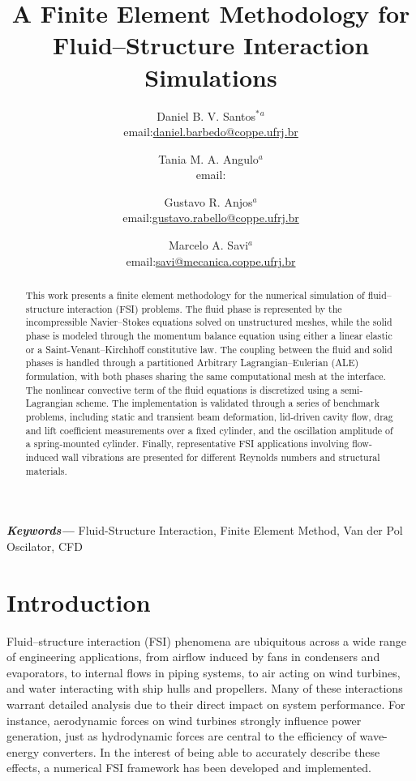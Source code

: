 \documentclass{article}
\title{A Finite Element Methodology for Fluid--Structure Interaction Simulations}
\author{Daniel B. V. Santos$^*$$^a$ \\
email:\href{daniel.barbedo@coppe.ufrj.br}{daniel.barbedo@coppe.ufrj.br}
\and
Tania M. A. Angulo$^a$ \\ email:\href{}{}
\and
Gustavo R. Anjos$^a$ \\ email:\href{gustavo.rabello@coppe.ufrj.br}{gustavo.rabello@coppe.ufrj.br}
\and
Marcelo A. Savi$^a$ \\ email:\href{savi@mecanica.coppe.ufrj.br}{savi@mecanica.coppe.ufrj.br}
}
\date{%
\begin{small}
    $^a$COPPE - Department of Mechanical Engineering, Universidade Federal do Rio de Janeiro (UFRJ)
    Av. Horacio Macedo, 2030, Cidade Universitária,  Rio de Janeiro, Brazil. Zip Code 21945-970 \\%
    $^*$Corresponding Author.\\[2ex]%
    \today
\end{small}
}
\providecommand{\keywords}[1]
{
  \small	
  \textbf{\textit{Keywords---}} #1
}
\begin{document}
\maketitle

\begin{abstract}
	
This work presents a finite element methodology for the numerical simulation of fluid--structure interaction (FSI) problems. The fluid phase is represented by the incompressible Navier--Stokes equations solved on unstructured meshes, while the solid phase is modeled through the momentum balance equation using either a linear elastic or a Saint-Venant--Kirchhoff constitutive law. The coupling between the fluid and solid phases is handled through a partitioned Arbitrary Lagrangian--Eulerian (ALE) formulation, with both phases sharing the same computational mesh at the interface. The nonlinear convective term of the fluid equations is discretized using a semi-Lagrangian scheme. The implementation is validated through a series of benchmark problems, including static and transient beam deformation, lid-driven cavity flow, drag and lift coefficient measurements over a fixed cylinder, and the oscillation amplitude of a spring-mounted cylinder. Finally, representative FSI applications involving flow-induced wall vibrations are presented for different Reynolds numbers and structural materials.
	
\end{abstract}


\keywords{Fluid-Structure Interaction, Finite Element Method, Van der Pol Oscilator, CFD}

\section{Introduction}


Fluid–structure interaction (FSI) phenomena are ubiquitous across a wide range of engineering applications, from airflow induced by fans in condensers and evaporators, to internal flows in piping systems, to air acting on wind turbines, and water interacting with ship hulls and propellers. Many of these interactions warrant detailed analysis due to their direct impact on system performance. For instance, aerodynamic forces on wind turbines strongly influence power generation, just as hydrodynamic forces are central to the efficiency of wave-energy converters. In the interest of being able to accurately describe these effects, a numerical FSI framework has been developed and implemented.
\end{document}
